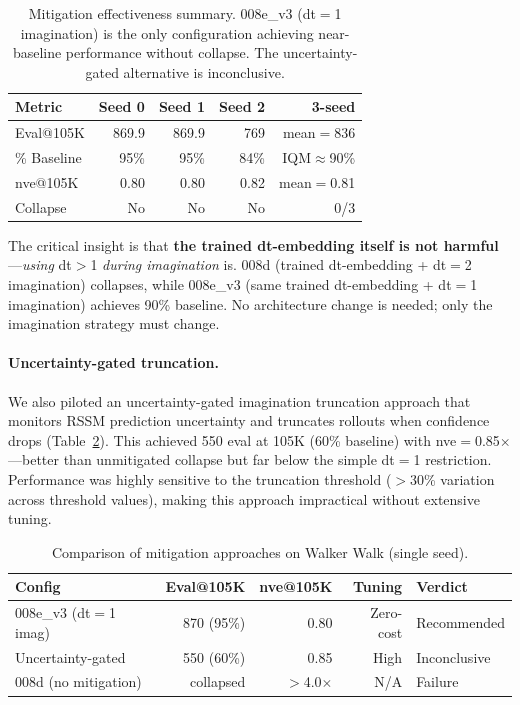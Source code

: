 \documentclass[letterpaper]{article}
\begin{document}
\begin{table}[t]
\centering
\caption{Mitigation effectiveness summary. 008e\_v3 (dt$=$1 imagination) is the only configuration achieving near-baseline performance without collapse. The uncertainty-gated alternative is inconclusive.}
\label{tab:mitigation_comparison}
\small
\begin{tabular}{lrrrr}
\toprule
\textbf{Metric} & \textbf{Seed 0} & \textbf{Seed 1} & \textbf{Seed 2} & \textbf{3-seed} \\
\midrule
Eval@105K & 869.9 & 869.9 & 769 & mean$=$836 \\
\% Baseline & 95\% & 95\% & 84\% & IQM$\approx$90\% \\
nve@105K & 0.80 & 0.80 & 0.82 & mean$=$0.81 \\
Collapse & No & No & No & 0/3 \\
\bottomrule
\end{tabular}
\end{table}

The critical insight is that \textbf{the trained dt-embedding itself is not harmful}---\emph{using} dt$>$1 \emph{during imagination} is.
008d (trained dt-embedding + dt$=$2 imagination) collapses, while 008e\_v3 (same trained dt-embedding + dt$=$1 imagination) achieves 90\% baseline.
No architecture change is needed; only the imagination strategy must change.

\paragraph{Uncertainty-gated truncation.}
We also piloted an uncertainty-gated imagination truncation approach that monitors RSSM prediction uncertainty and truncates rollouts when confidence drops (Table~\ref{tab:mitigation_comparison_alt}).
This achieved 550 eval at 105K (60\% baseline) with nve$=$0.85$\times$---better than unmitigated collapse but far below the simple dt$=$1 restriction.
Performance was highly sensitive to the truncation threshold ($>$30\% variation across threshold values), making this approach impractical without extensive tuning.

\begin{table}[t]
\centering
\caption{Comparison of mitigation approaches on Walker Walk (single seed).}
\label{tab:mitigation_comparison_alt}
\small
\begin{tabular}{lrrrl}
\toprule
\textbf{Config} & \textbf{Eval@105K} & \textbf{nve@105K} & \textbf{Tuning} & \textbf{Verdict} \\
\midrule
008e\_v3 (dt$=$1 imag) & 870 (95\%) & 0.80 & Zero-cost & Recommended \\
Uncertainty-gated & 550 (60\%) & 0.85 & High & Inconclusive \\
008d (no mitigation) & collapsed & $>$4.0$\times$ & N/A & Failure \\
\bottomrule
\end{tabular}
\end{table}
\end{document}
